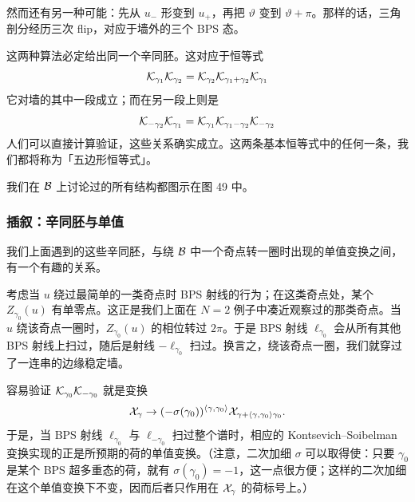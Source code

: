 然而还有另一种可能：先从 $u_-$ 形变到 $u_+$，再把 $\vartheta$ 变到 $\vartheta+\pi$。那样的话，三角剖分经历三次 flip，对应于墙外的三个 BPS 态。

这两种算法必定给出同一个辛同胚。这对应于恒等式
\begin{equation}\label{eq:simple-pentagon}
\mathcal{K}_{\gamma_1} \mathcal{K}_{\gamma_2} = \mathcal{K}_{\gamma_2} \mathcal{K}_{\gamma_1+\gamma_2} \mathcal{K}_{\gamma_1}
\end{equation}
它对墙的其中一段成立；而在另一段上则是
\begin{equation}\label{eq:simple-pentagon-2}
\mathcal{K}_{-\gamma_2} \mathcal{K}_{\gamma_1} = \mathcal{K}_{\gamma_1} \mathcal{K}_{\gamma_1-\gamma_2} \mathcal{K}_{-\gamma_2}
\end{equation}
人们可以直接计算验证，这些关系确实成立。这两条基本恒等式中的任何一条，我们都将称为「五边形恒等式」。


我们在 $\mathcal{B}$ 上讨论过的所有结构都图示在图 49 中。


\subsubsection{插叙：辛同胚与单值}

我们上面遇到的这些辛同胚，与绕 $\mathcal{B}$ 中一个奇点转一圈时出现的单值变换之间，有一个有趣的关系。

考虑当 $u$ 绕过最简单的一类奇点时 BPS 射线的行为；在这类奇点处，某个 $Z_{\gamma_0}(u)$ 有单零点。这正是我们上面在 $N=2$ 例子中凑近观察过的那类奇点。当 $u$ 绕该奇点一圈时，$Z_{\gamma_0}(u)$ 的相位转过 $2 \pi$。于是 BPS 射线 $\ell_{\gamma_0}$ 会从所有其他 BPS 射线上扫过，随后是射线 $-\ell_{\gamma_0}$ 扫过。换言之，绕该奇点一圈，我们就穿过了一连串的边缘稳定墙。

容易验证 $\mathcal{K}_{\gamma_0} \mathcal{K}_{-\gamma_0}$ 就是变换
\begin{equation}
   \mathcal{X}_\gamma \to (-\sigma(\gamma_0))^{\langle \gamma,\gamma_0 \rangle}
   \mathcal{X}_{\gamma+ \langle \gamma,\gamma_0 \rangle \gamma_0}. \label{eq:KS-monodromy}
\end{equation}
于是，当 BPS 射线 $\ell_{\gamma_0}$ 与 $\ell_{-\gamma_0}$ 扫过整个谱时，相应的 Kontsevich–Soibelman 变换实现的正是所预期的荷的单值变换。（注意，二次加细 $\sigma$ 可以取得使：只要 $\gamma_0$ 是某个 BPS 超多重态的荷，就有 $\sigma(\gamma_0) = -1$，这一点很方便；这样的二次加细在这个单值变换下不变，因而后者只作用在 $\mathcal{X}_\gamma$ 的荷标号上。）

